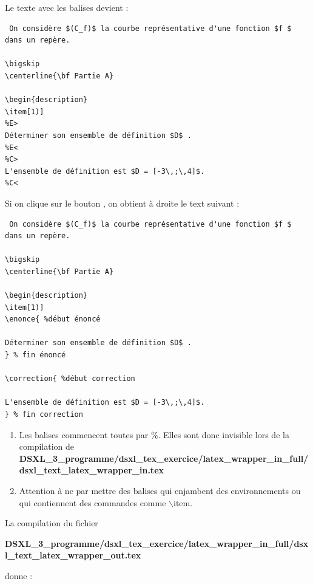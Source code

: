 Le texte avec les balises devient : 
\begin{verbatim}
 On considère $(C_f)$ la courbe représentative d'une fonction $f $ dans un repère.

\bigskip
\centerline{\bf Partie A}

\begin{description}
\item[1)] 
%E>
Déterminer son ensemble de définition $D$ .
%E<
%C>
L'ensemble de définition est $D = [-3\,;\,4]$. 
%C<
\end{verbatim}

Si on clique sur le bouton , on obtient à droite le text suivant : 

\begin{verbatim}
 On considère $(C_f)$ la courbe représentative d'une fonction $f $ dans un repère.

\bigskip
\centerline{\bf Partie A}

\begin{description}
\item[1)] 
\enonce{ %début énoncé 

Déterminer son ensemble de définition $D$ .
} % fin énoncé 

\correction{ %début correction 

L'ensemble de définition est $D = [-3\,;\,4]$. 
} % fin correction 
\end{verbatim}

\begin{remarque}

\begin{enumerate}
 \item  Les balises commencent toutes par \%. Elles sont donc invisible lors de la compilation de \\
 {\bf DSXL\_3\_programme/dsxl\_tex\_exercice/latex\_wrapper\_in\_full/dsxl\_text\_latex\_wrapper\_in.tex}
 \item Attention à ne par mettre des balises qui enjambent des environnements ou qui contiennent des commandes comme $\backslash$item. 
\end{enumerate}


\end{remarque}

La compilation du fichier 

 {\bf DSXL\_3\_programme/dsxl\_tex\_exercice/latex\_wrapper\_in\_full/dsxl\_text\_latex\_wrapper\_out.tex}
 
 donne : 

